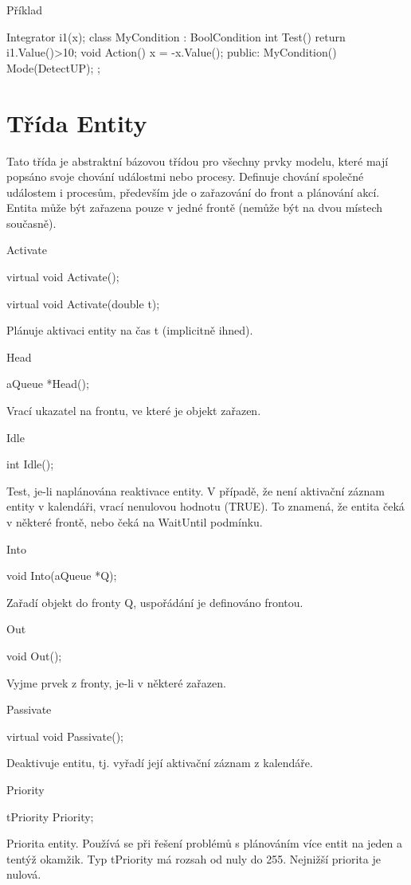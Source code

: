 \documentclass[a4paper]{article}
\begin{document}
Příklad

Integrator i1(x);
class MyCondition : BoolCondition {
  int Test()    { return i1.Value()>10; }
  void Action() { x = -x.Value(); }
public:
  MyCondition() { Mode(DetectUP); }
};

\section{Třída Entity}

Tato třída je abstraktní bázovou třídou pro všechny prvky modelu,
které mají popsáno svoje chování událostmi nebo procesy. Definuje
chování společné událostem i procesům, především jde o zařazování
do front a plánování akcí. Entita může být zařazena pouze v jedné
frontě (nemůže být na dvou místech současně).


Activate

  virtual void Activate();

  virtual void Activate(double t);


Plánuje aktivaci entity na čas t (implicitně ihned).


Head

  aQueue *Head();


Vrací ukazatel na frontu, ve které je objekt zařazen.


Idle

  int Idle();


Test, je-li naplánována reaktivace entity. V případě, že není aktivační
záznam entity v kalendáři, vrací nenulovou hodnotu (TRUE). To znamená,
že entita čeká v některé frontě, nebo čeká na WaitUntil
podmínku.


Into

  void Into(aQueue *Q);


Zařadí objekt do fronty Q, uspořádání je definováno frontou.


Out

  void Out();


Vyjme prvek z fronty, je-li v některé zařazen.


Passivate

  virtual void Passivate();


Deaktivuje entitu, tj. vyřadí její aktivační záznam z kalendáře.


Priority

  tPriority Priority;


Priorita entity. Používá se při řešení problémů s plánováním více
entit na jeden a tentýž okamžik. Typ tPriority má rozsah od nuly
do 255. Nejnižší priorita je nulová.
\end{document}

